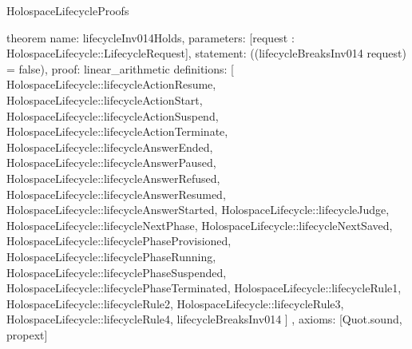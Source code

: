 \begin{lexlean}{HolospaceLifecycleProofs}
\begin{semanticmodule}
theorem{
  name: lifecycleInv014Holds,
  parameters: [request : HolospaceLifecycle::LifecycleRequest],
  statement: ((lifecycleBreaksInv014 request) = false),
  proof: linear_arithmetic{
    definitions: [
      HolospaceLifecycle::lifecycleActionResume,
      HolospaceLifecycle::lifecycleActionStart,
      HolospaceLifecycle::lifecycleActionSuspend,
      HolospaceLifecycle::lifecycleActionTerminate,
      HolospaceLifecycle::lifecycleAnswerEnded,
      HolospaceLifecycle::lifecycleAnswerPaused,
      HolospaceLifecycle::lifecycleAnswerRefused,
      HolospaceLifecycle::lifecycleAnswerResumed,
      HolospaceLifecycle::lifecycleAnswerStarted,
      HolospaceLifecycle::lifecycleJudge,
      HolospaceLifecycle::lifecycleNextPhase,
      HolospaceLifecycle::lifecycleNextSaved,
      HolospaceLifecycle::lifecyclePhaseProvisioned,
      HolospaceLifecycle::lifecyclePhaseRunning,
      HolospaceLifecycle::lifecyclePhaseSuspended,
      HolospaceLifecycle::lifecyclePhaseTerminated,
      HolospaceLifecycle::lifecycleRule1,
      HolospaceLifecycle::lifecycleRule2,
      HolospaceLifecycle::lifecycleRule3,
      HolospaceLifecycle::lifecycleRule4,
      lifecycleBreaksInv014
    ]
  },
  axioms: [Quot.sound, propext]
}
\end{semanticmodule}
\end{lexlean}
